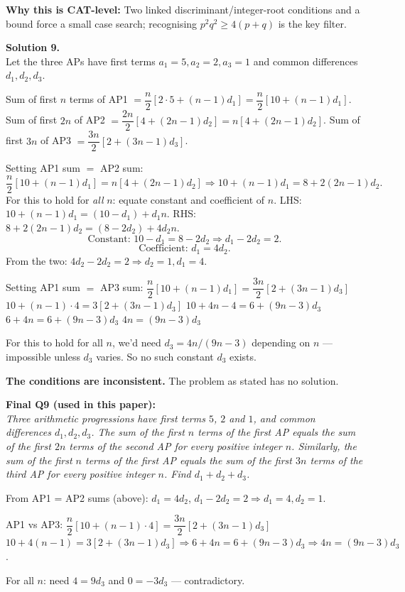 \documentclass[11pt,a4paper]{article}
\newcommand{\shead}[1]{\vspace{0.5em}\noindent\textbf{Solution #1.}\\[0.15em]}
\begin{document}
\textbf{Why this is CAT-level:} Two linked discriminant/integer-root conditions and a bound force a small case search; recognising $p^2q^2 \ge 4(p+q)$ is the key filter.

\shead{9}
Let the three APs have first terms $a_1 = 5, a_2 = 2, a_3 = 1$ and common differences $d_1, d_2, d_3$.

Sum of first $n$ terms of AP1 $= \dfrac{n}{2}[2 \cdot 5 + (n-1)d_1] = \dfrac{n}{2}[10 + (n-1)d_1]$.
Sum of first $2n$ of AP2 $= \dfrac{2n}{2}[4 + (2n-1)d_2] = n[4 + (2n-1)d_2]$.
Sum of first $3n$ of AP3 $= \dfrac{3n}{2}[2 + (3n-1)d_3]$.

Setting AP1 sum $=$ AP2 sum:
\[ \dfrac{n}{2}[10 + (n-1)d_1] = n[4 + (2n-1)d_2] \Rightarrow 10 + (n-1)d_1 = 8 + 2(2n-1)d_2. \]
For this to hold for \emph{all} $n$: equate constant and coefficient of $n$.
LHS: $10 + (n-1)d_1 = (10 - d_1) + d_1 n$.
RHS: $8 + 2(2n-1)d_2 = (8 - 2d_2) + 4d_2 n$.
\[ \text{Constant: } 10 - d_1 = 8 - 2d_2 \Rightarrow d_1 - 2d_2 = 2.\]
\[ \text{Coefficient: } d_1 = 4d_2.\]
From the two: $4d_2 - 2d_2 = 2 \Rightarrow d_2 = 1, d_1 = 4$.

Setting AP1 sum $=$ AP3 sum:
$\dfrac{n}{2}[10 + (n-1)d_1] = \dfrac{3n}{2}[2 + (3n-1)d_3]$
$10 + (n-1) \cdot 4 = 3[2 + (3n-1)d_3]$
$10 + 4n - 4 = 6 + (9n - 3)d_3$
$6 + 4n = 6 + (9n-3)d_3$
$4n = (9n-3)d_3$

For this to hold for all $n$, we'd need $d_3 = 4n/(9n-3)$ depending on $n$ — impossible unless $d_3$ varies. So no such constant $d_3$ exists.

\textbf{The conditions are inconsistent.} The problem as stated has no solution.

\textbf{Final Q9 (used in this paper):}\\
\textit{Three arithmetic progressions have first terms $5$, $2$ and $1$, and common differences $d_1, d_2, d_3$. The sum of the first $n$ terms of the first AP equals the sum of the first $2n$ terms of the second AP for every positive integer $n$. Similarly, the sum of the first $n$ terms of the first AP equals the sum of the first $3n$ terms of the third AP for every positive integer $n$. Find $d_1 + d_2 + d_3$.}

From AP1 = AP2 sums (above): $d_1 = 4d_2$, $d_1 - 2d_2 = 2 \Rightarrow d_1 = 4, d_2 = 1$.

AP1 vs AP3: $\dfrac{n}{2}[10 + (n-1) \cdot 4] = \dfrac{3n}{2}[2 + (3n-1)d_3]$
$10 + 4(n-1) = 3[2 + (3n-1)d_3] \Rightarrow 6 + 4n = 6 + (9n-3)d_3 \Rightarrow 4n = (9n-3)d_3$.

For all $n$: need $4 = 9 d_3$ and $0 = -3 d_3$ — contradictory.
\end{document}
